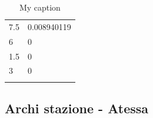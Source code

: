 \begin{longtable}{|l|l|}
     \rowcolor[HTML]{32CB00} 
     7.5                                                     & 0.008940119                                                   \\
     \rowcolor[HTML]{32CB00} 
     6                                                       & 0                                                             \\
     \rowcolor[HTML]{32CB00} 
     1.5                                                     & 0                                                             \\
     \rowcolor[HTML]{32CB00} 
     3                                                       & 0                \\ \hline
	\caption{My caption}
	\label{my-label1}
\end{longtable}

\subsection{Archi stazione - Atessa}